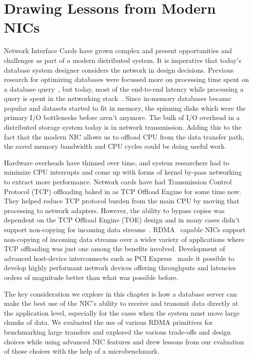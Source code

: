 \chapter{Drawing Lessons from Modern NICs}
\label{chap:modernnics}
Network Interface Cards have grown complex and present opportunities and  challenges as part of a modern distributed system.
 It is imperative that today's database system designer considers the network in design decisions. Previous research for optimizing databases were focussed more on processing time spent on a database query~\cite{dbmsproctime},
  but today, most of the end-to-end latency while processing a query is spent in the  networking stack~\cite{ramcloudosr}.
Since in-memory databases became popular and datasets started to fit in memory, the spinning disks 
which were the primary I/O bottlenecks before aren't anymore. The bulk of I/O overhead in a distributed storage system today is in network transmission.
Adding this to the fact that the modern NIC allows us to offload CPU from the data transfer path,
the saved memory bandwidth and CPU cycles could be doing useful work.

Hardware overheads have thinned over time, and system researchers had to minimize CPU interrupts and come up with forms of kernel by-pass networking to extract more performance.
 Network cards have had Transmission Control Protocol (TCP) offloading baked in as TCP Offload Engine for some time now. They helped reduce TCP protocol burden from the main CPU by moving that processing to network adapters.
 However, the ability to bypass copies was dependent on the TCP Offload Engine (TOE) design and in   many cases didn't support non-copying for incoming data streams~\cite{tcpoffload}. 
  RDMA~\cite{rdmapatent,rdmacase,rdma} capable NICs support non-copying of incoming data streams over a wider variety of applications where TCP offloading was just one among the benefits  involved.
 Development of advanced host-device  interconnects such as PCI Express~\cite{pcie}  made it possible to develop highly performant network devices offering throughputs and latencies orders of magnitude better than what was possible before.

 The key consideration we explore in this chapter is how a database server can make the best use of the NIC's ability to receive and transmit data directly at the application level, especially for the
cases when the system must move large chunks of data. We evaluated
the use of various RDMA primitives for benchmarking large transfers and explored the various
 trade-offs and design choices while using advanced NIC features and drew lessons from our evaluation of those choices with the help of a microbenchmark. 

